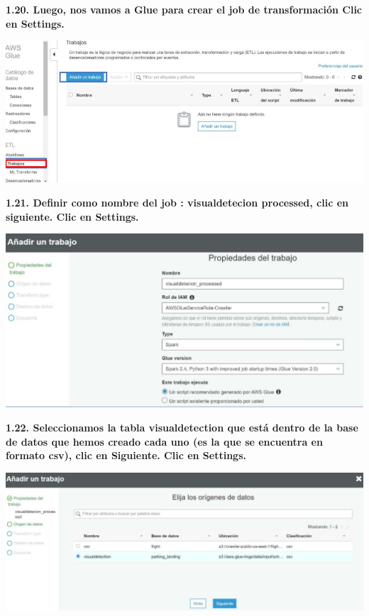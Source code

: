\documentclass{article}
\begin{document}
	
		\textbf{1.20.  Luego, nos vamos a Glue para crear el job de transformación
Clic en Settings.
}

    \begin{center}
		\includegraphics[width=15cm]{./images/21} 
	\end{center}
	
	
		\textbf{1.21. Definir como nombre del job : visualdetecion processed, clic en siguiente.
Clic en Settings.
}

    \begin{center}
		\includegraphics[width=15cm]{./images/22} 
	\end{center}
	
	
		\textbf{1.22.  Seleccionamos la tabla visualdetection que está dentro de la base de datos que hemos creado cada uno
(es la que se encuentra en formato csv), clic en Siguiente.
Clic en Settings.
}

    \begin{center}
		\includegraphics[width=15cm]{./images/23} 
	\end{center}
	
\end{document}
